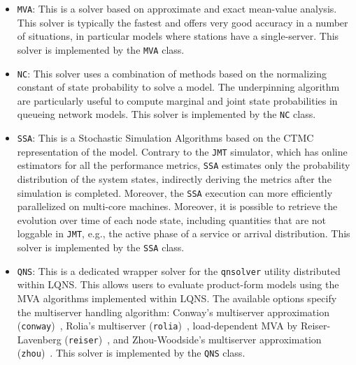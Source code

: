 \begin{itemize}
\item \texttt{MVA}: This is a solver based on approximate and exact mean-value analysis. This solver is typically the fastest and offers very good accuracy in a number of situations, in particular models where stations have a single-server. This solver is implemented by the \texttt{MVA} class. %
\item \texttt{NC}: This solver uses a combination of methods based on the normalizing constant of state probability to solve a model. The underpinning algorithm are particularly useful to compute marginal and joint state probabilities in queueing network models. This solver is implemented by the \texttt{NC} class.
\item \texttt{SSA}: This is a Stochastic Simulation Algorithms based on the CTMC representation of the model. Contrary to the \texttt{JMT} simulator, which has online estimators for all the performance metrics, \texttt{SSA} estimates only the probability distribution of the system states, indirectly deriving the metrics after the simulation is completed. Moreover, the \texttt{SSA} execution can more efficiently parallelized on multi-core machines. Moreover, it is possible to retrieve the evolution over time of each node state, including quantities that are not loggable in \texttt{JMT}, e.g., the active phase of a service or arrival distribution. This solver is implemented by the \texttt{SSA} class.
\item \texttt{QNS}: This is a dedicated wrapper  solver for the \texttt{qnsolver} utility distributed within LQNS. This allows users to evaluate product-form models using the MVA algorithms implemented within LQNS. The available options specify the multiserver handling algorithm: Conway's multiserver approximation (\texttt{conway})~\cite{Con89}, Rolia's multiserver (\texttt{rolia})~\cite{roli.sevc95}, load-dependent MVA by Reiser-Lavenberg (\texttt{reiser})~\cite{reis.lave80}, and Zhou-Woodside's multiserver approximation (\texttt{zhou})~\cite{Woo22}. This solver is implemented by the \texttt{QNS} class.
\end{itemize}

